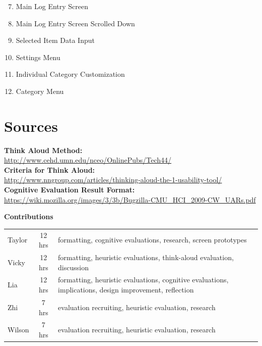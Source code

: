 \documentclass[pdftex,12pt,a4paper]{report}
\begin{document}
\begin{minipage}{0.5\textwidth}
\begin{enumerate}
\setcounter{enumi}{6}
\item{Main Log Entry Screen}
\item{Main Log Entry Screen Scrolled Down}
\item{Selected Item Data Input}
\item{Settings Menu}
\item{Individual Category Customization}
\item{Category Menu}
\end{enumerate}
\hfill
\end{minipage}
\section*{Sources}
\textbf{Think Aloud Method:} \\
{\url{http://www.cehd.umn.edu/nceo/OnlinePubs/Tech44/}}\vspace{12pt}
\\\textbf{Criteria for Think Aloud:}\\ \vspace{12pt}
 {\url{http://www.nngroup.com/articles/thinking-aloud-the-1-usability-tool/}}
\\\textbf{Cognitive Evaluation Result Format:}\\
{\url{https://wiki.mozilla.org/images/3/3b/Bugzilla-CMU_HCI_2009-CW_UARs.pdf}}



\vspace{1.5cm}
\noindent\textbf{Contributions}
\begin{center}
\begin{tabularx}{\textwidth}{l @{ -- } c X}
Taylor & 12 hrs & formatting, cognitive evaluations, research, screen prototypes\\
Vicky & 12 hrs & formatting, heuristic evaluations, think-aloud evaluation, discussion\\
Lia & 12 hrs & formatting, heuristic evaluations, cognitive evaluations, implications, design improvement, reflection\\
Zhi & 7 hrs & evaluation recruiting, heuristic evaluation, research\\
Wilson & 7 hrs & evaluation recruiting, heuristic evaluation, research\\
\end{tabularx}
\end{center}
\end{document}
